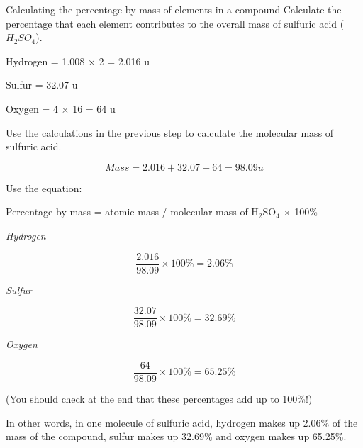 \begin{wex}{Calculating the percentage by mass of elements in a compound}{
Calculate the percentage that each element contributes to the overall mass of sulfuric acid ($H_{2}SO_{4}$).\\}

{

Hydrogen = 1.008 $\times$ 2 = 2.016 u

Sulfur = 32.07 u

Oxygen = 4 $\times$ 16 = 64 u\\
}

{
Use the calculations in the previous step to calculate the molecular mass of sulfuric acid. 

\begin{equation*}
Mass = 2.016 + 32.07 + 64 = 98.09 u
\end{equation*}
}


{

Use the equation:

\begin{center}
Percentage by mass = atomic mass / molecular mass of H$_{2}$SO$_{4}$ $\times$ 100\%
\end{center}


\textit{Hydrogen}

\begin{equation*}
\frac{2.016}{98.09} \times 100\% = 2.06\%
\end{equation*}

\textit{Sulfur}

\begin{equation*}
\frac{32.07}{98.09} \times 100\% = 32.69\%
\end{equation*}

\textit{Oxygen}

\begin{equation*}
\frac{64}{98.09} \times 100\% = 65.25\%
\end{equation*}


(You should check at the end that these percentages add up to 100\%!)

In other words, in one molecule of sulfuric acid, hydrogen makes up 2.06\% of the mass of the compound, sulfur makes up 32.69\% and oxygen makes up 65.25\%.
}

\end{wex}


